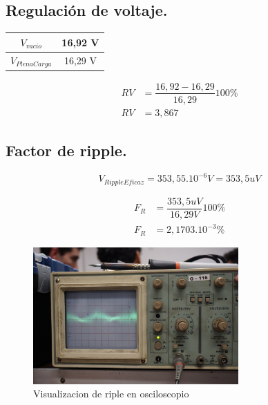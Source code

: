 \subsection{Regulación de voltaje.}

\begin{table}[H]
  \centering
  \begin{tabular}{|c|c|}
    \hline
    $V_{vacio}$ & 16,92 V \\ \hline
    $V_{PlenaCarga}$ & 16,29 V \\ \hline
  \end{tabular}
\end{table}

\begin{equation}
  \begin{aligned}
    RV &= \dfrac{16,92 - 16,29}{16,29} 100\percent\\
    RV &= 3,867
  \end{aligned}
\end{equation}

\subsection{Factor de ripple.}

\begin{equation}
  V_{RippleEficaz} = 353,55 . 10^{-6} V = 353,5 uV 
\end{equation}

\begin{equation}
  \begin{aligned}
    F_R &= \dfrac{353,5 uV}{16,29 V} 100\percent\\
    F_R &= 2,1703 . 10^{-3}\percent
  \end{aligned}
\end{equation}

\begin{figure}[H]
  \centering
  \includegraphics[width=0.70\textwidth]{images/medicionRipple.png}
  \caption{Visualizacion de riple en osciloscopio}
\end{figure}


